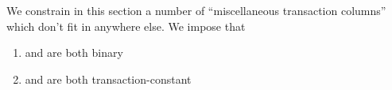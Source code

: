 We constrain in this section a number of ``miscellaneous transaction columns'' which don't fit in anywhere else.
We impose that
\begin{enumerate}
    \item \rlpTxnCommonColumnReplayProtection{} and \rlpTxnCommonColumnYparity{} are both binary
    \item \rlpTxnCommonColumnReplayProtection{} and \rlpTxnCommonColumnYparity{} are both transaction-constant
\end{enumerate}
